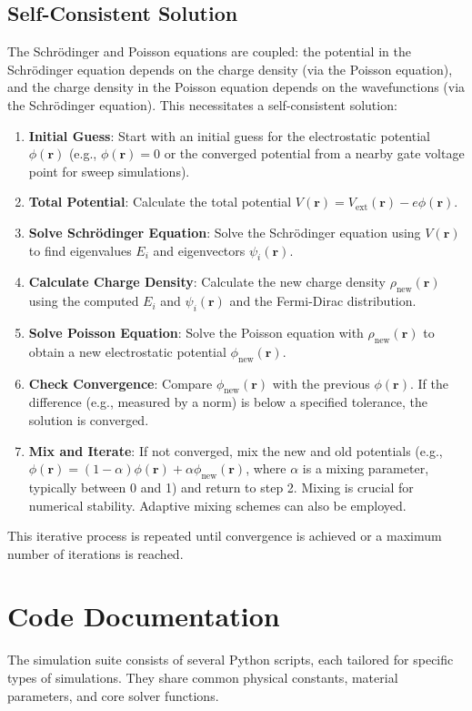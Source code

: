 \documentclass{article}
\begin{document}
\subsection{Self-Consistent Solution}
The Schrödinger and Poisson equations are coupled: the potential in the Schrödinger equation depends on the charge density (via the Poisson equation), and the charge density in the Poisson equation depends on the wavefunctions (via the Schrödinger equation). This necessitates a self-consistent solution:
\begin{enumerate}
    \item \textbf{Initial Guess}: Start with an initial guess for the electrostatic potential $\phi(\mathbf{r})$ (e.g., $\phi(\mathbf{r}) = 0$ or the converged potential from a nearby gate voltage point for sweep simulations).
    \item \textbf{Total Potential}: Calculate the total potential $V(\mathbf{r}) = V_{\text{ext}}(\mathbf{r}) - e \phi(\mathbf{r})$.
    \item \textbf{Solve Schrödinger Equation}: Solve the Schrödinger equation using $V(\mathbf{r})$ to find eigenvalues $E_i$ and eigenvectors $\psi_i(\mathbf{r})$.
    \item \textbf{Calculate Charge Density}: Calculate the new charge density $\rho_{\text{new}}(\mathbf{r})$ using the computed $E_i$ and $\psi_i(\mathbf{r})$ and the Fermi-Dirac distribution.
    \item \textbf{Solve Poisson Equation}: Solve the Poisson equation with $\rho_{\text{new}}(\mathbf{r})$ to obtain a new electrostatic potential $\phi_{\text{new}}(\mathbf{r})$.
    \item \textbf{Check Convergence}: Compare $\phi_{\text{new}}(\mathbf{r})$ with the previous $\phi(\mathbf{r})$. If the difference (e.g., measured by a norm) is below a specified tolerance, the solution is converged.
    \item \textbf{Mix and Iterate}: If not converged, mix the new and old potentials (e.g., $\phi(\mathbf{r}) = (1-\alpha)\phi(\mathbf{r}) + \alpha\phi_{\text{new}}(\mathbf{r})$, where $\alpha$ is a mixing parameter, typically between 0 and 1) and return to step 2. Mixing is crucial for numerical stability. Adaptive mixing schemes can also be employed.
\end{enumerate}
This iterative process is repeated until convergence is achieved or a maximum number of iterations is reached.

\section{Code Documentation}
The simulation suite consists of several Python scripts, each tailored for specific types of simulations. They share common physical constants, material parameters, and core solver functions.
\end{document}
